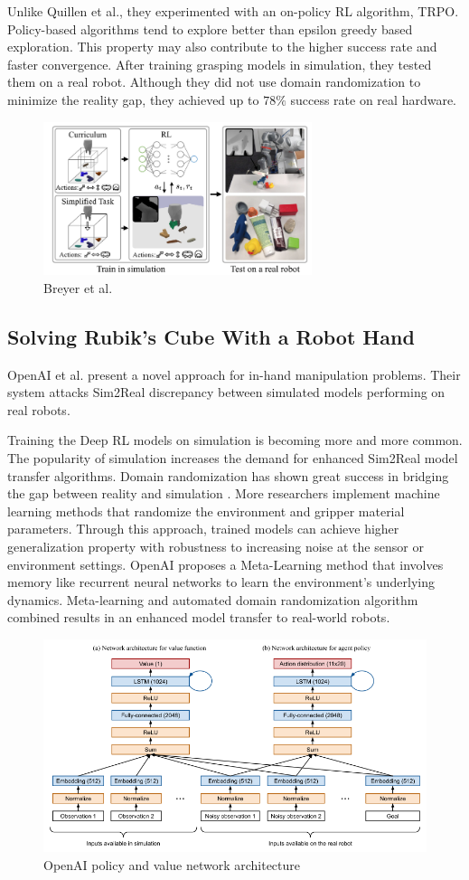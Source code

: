 Unlike Quillen et al., they experimented with an on-policy RL algorithm, TRPO. Policy-based algorithms tend to
explore better than epsilon greedy based exploration. This property may also contribute to the higher success rate and faster convergence. After training grasping models in simulation, they tested them on a real robot. Although they did not use domain randomization to minimize the reality gap, they achieved up to \(78\%\) success rate on real hardware.

\begin{figure}[htbp]
    \centering
    \includegraphics[width=0.7\textwidth]{figures/curriculum}
    \caption{Breyer et al. \cite{Breyer2018}}
    \label{fig:dql}
\end{figure}


\subsection{Solving Rubik's Cube With a Robot Hand}

OpenAI et al. present a novel approach for in-hand manipulation problems. Their system attacks Sim2Real discrepancy between simulated models performing on real robots. 

Training the Deep RL models on simulation is becoming more and more common. The popularity of simulation increases the demand for enhanced Sim2Real model transfer algorithms. Domain randomization has shown great success in bridging the gap between reality and simulation \cite{Tobin2017}. More researchers implement machine learning methods that randomize the environment and gripper material parameters. Through this approach, trained models can achieve higher generalization property with robustness to increasing noise at the sensor or environment settings.
OpenAI proposes a Meta-Learning method that involves memory like recurrent neural networks to learn the environment's underlying dynamics. Meta-learning and automated domain randomization algorithm combined results in an enhanced model transfer to real-world robots.

\begin{figure}[htbp]
    \centering
    \includegraphics[width=1.\textwidth]{figures/openai}
    \caption{OpenAI policy and value network architecture \cite{openai2019rubiks}}
    \label{fig:dql}
\end{figure}